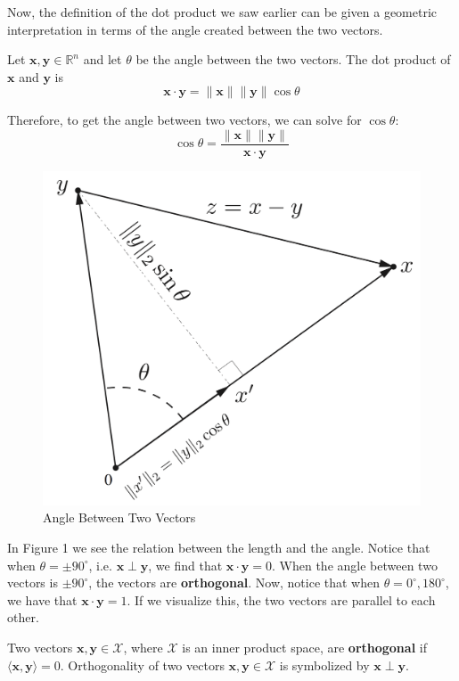 \documentclass[12pt]{article}
\begin{document}
\noindent Now, the definition of the dot product we saw earlier can be given a geometric interpretation in terms of the angle created between the two vectors. 
\begin{definition}
Let $\mathbf{x}, \mathbf{y}\in\mathbb{R}^n$ and let $\theta$ be the angle between the two vectors. The dot product of $\mathbf{x}$ and $\mathbf{y}$ is $$\mathbf{x}\cdot \mathbf{y} = \|\mathbf{x}\|\|\mathbf{y}\|\cos\theta$$
\end{definition}
\noindent Therefore, to get the angle between two vectors, we can solve for $\cos\theta$: $$\cos\theta = \frac{\|\mathbf{x}\|\|\mathbf{y}\|}{\mathbf{x}\cdot \mathbf{y}}$$
\pagebreak
\begin{figure}[h!]\begin{center}\includegraphics[scale=0.2]{figures/angles}\caption{Angle Between Two Vectors}\end{center}\end{figure}

\noindent In Figure 1 we see the relation between the length and the angle. Notice that when $\theta = \pm 90^\circ$, i.e. $\mathbf{x}\perp\mathbf{y}$, we find that $\mathbf{x}\cdot \mathbf{y} = 0$. When the angle between two vectors is $\pm 90^\circ$, the vectors are \textbf{orthogonal}. Now, notice that when $\theta = 0^\circ, 180^\circ$, we have that $\mathbf{x}\cdot \mathbf{y} = 1$. If we visualize this, the two vectors are parallel to each other. 

\begin{definition}
Two vectors $\mathbf{x},\mathbf{y}\in \mathcal{X}$, where $\mathcal{X}$ is an inner product space, are \textbf{orthogonal} if $\langle \mathbf{x}, \mathbf{y}\rangle = 0$. Orthogonality of two vectors $\mathbf{x},\mathbf{y}\in \mathcal{X}$ is symbolized by $\mathbf{x}\perp\mathbf{y}$. 
\end{definition}
\end{document}
